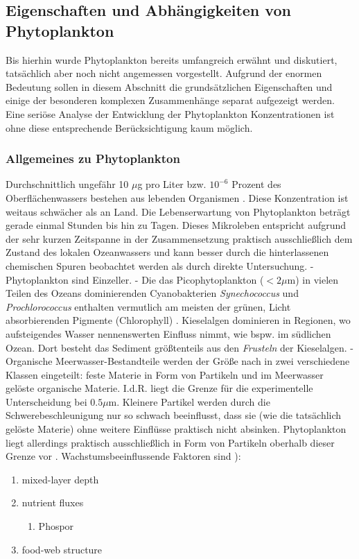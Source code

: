 \documentclass[12pt,a4paper,onecolumn,draft]{scrartcl}
\begin{document}
\subsection{Eigenschaften und Abhängigkeiten von Phytoplankton} \label{sec:Phytoplankton}
Bis hierhin wurde Phytoplankton bereits umfangreich erwähnt und diskutiert, tatsächlich aber noch nicht angemessen vorgestellt. Aufgrund der enormen Bedeutung sollen in diesem Abschnitt die grundsätzlichen Eigenschaften und einige der besonderen komplexen Zusammenhänge separat aufgezeigt werden. Eine seriöse Analyse der Entwicklung der Phytoplankton Konzentrationen ist ohne diese entsprechende Berücksichtigung kaum möglich.
\subsubsection{Allgemeines zu Phytoplankton} \label{sec:Phytobasics}
Durchschnittlich ungefähr 10 $\mu$g pro Liter bzw. $10^{-6}$ Prozent des Oberflächenwassers bestehen aus lebenden Organismen \citep{Emerson.2009}. Diese Konzentration ist weitaus schwächer als an Land. Die Lebenserwartung von Phytoplankton beträgt gerade einmal Stunden bis hin zu Tagen. Dieses Mikroleben entspricht aufgrund der sehr kurzen Zeitspanne in der Zusammensetzung praktisch ausschließlich dem Zustand des lokalen Ozeanwassers und kann besser durch die hinterlassenen chemischen Spuren beobachtet werden als durch direkte Untersuchung. - Phytoplankton sind Einzeller. - Die das Picophytoplankton ($<2\mu$m) in vielen Teilen des Ozeans dominierenden Cyanobakterien \textit{Synechococcus}  und \textit{Prochlorococcus} enthalten vermutlich am meisten der grünen, Licht absorbierenden Pigmente (Chlorophyll) \citep{Emerson.2009}. Kieselalgen dominieren in Regionen, wo aufsteigendes Wasser nennenswerten Einfluss nimmt, wie bspw. im südlichen Ozean. Dort besteht das Sediment größtenteils aus den \textit{Frusteln} der Kieselalgen. - Organische Meerwasser-Bestandteile werden der Größe nach in zwei verschiedene Klassen eingeteilt: feste Materie in Form von Partikeln und im Meerwasser  gelöste organische Materie. I.d.R. liegt die Grenze für die experimentelle Unterscheidung bei $0.5 \mu$m. Kleinere Partikel werden durch die Schwerebeschleunigung nur so schwach beeinflusst, dass sie (wie die tatsächlich gelöste Materie) ohne weitere Einflüsse praktisch nicht absinken. Phytoplankton liegt allerdings praktisch ausschließlich in Form von Partikeln oberhalb dieser Grenze vor \citep{Emerson.2009}.
Wachstumsbeeinflussende Faktoren sind \citep{Falkowski.1998}):
\begin{enumerate}
\item mixed-layer depth
\item nutrient fluxes
\begin{enumerate}
\item Phospor \citep{REDFIELD.1960}
\end{enumerate}
\item food-web structure
\end{enumerate}
\end{document}
